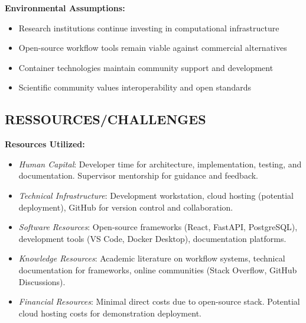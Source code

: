 \documentclass[12pt]{article}
\begin{document}
\textbf{Environmental Assumptions:}
\begin{itemize}
    \item Research institutions continue investing in computational infrastructure
    \item Open-source workflow tools remain viable against commercial alternatives
    \item Container technologies maintain community support and development
    \item Scientific community values interoperability and open standards
\end{itemize}

\subsection{RESSOURCES/CHALLENGES}

\textbf{Resources Utilized:}
\begin{itemize}
    \item \textit{Human Capital}: Developer time for architecture, implementation, testing, and documentation. Supervisor mentorship for guidance and feedback.
    
    \item \textit{Technical Infrastructure}: Development workstation, cloud hosting (potential deployment), GitHub for version control and collaboration.
    
    \item \textit{Software Resources}: Open-source frameworks (React, FastAPI, PostgreSQL), development tools (VS Code, Docker Desktop), documentation platforms.
    
    \item \textit{Knowledge Resources}: Academic literature on workflow systems, technical documentation for frameworks, online communities (Stack Overflow, GitHub Discussions).
    
    \item \textit{Financial Resources}: Minimal direct costs due to open-source stack. Potential cloud hosting costs for demonstration deployment.
\end{itemize}
\end{document}
